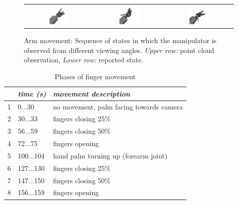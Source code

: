 \begin{figure}
\begin{tabular}{c:c:c}
\includegraphics[width=0.3\textwidth]{images/eval_vicon/sequence/arm_movement/rep_55.png} & \includegraphics[width=0.3\textwidth]{images/eval_vicon/sequence/arm_movement/rep_91.png} & \includegraphics[width=0.3\textwidth]{images/eval_vicon/sequence/arm_movement/rep_132.png} \\
\end{tabular}
\caption[Arm movement sequence]{Arm movement: Sequence of states in which the manipulator is observed from different viewing angles. \textit{Upper row:} point cloud observation, \textit{Lower row:} reported state.}
\label{fig:arm_movement_states}
\end{figure}


\begin{table}
\centering
\begin{tabular}{|c|l|l|}
\hline
 & \emph{time (s)} & \emph{movement description} \\
\hline
1 & 0$\dots$30 & no movement, palm facing towards camera \\
\hline
2 & 30$\dots$33 & fingers closing 25\% \\
\hline
3 & 56$\dots$59 & fingers closing 50\% \\
\hline
4 & 72$\dots$75 & fingers opening \\
\hline
5 & 100$\dots$104 & hand palm turning up (forearm joint) \\
\hline
6 & 127$\dots$130 & fingers closing 25\% \\
\hline
7 & 147$\dots$150 & fingers closing 50\% \\
\hline
8 & 156$\dots$159 & fingers opening \\
\hline
\end{tabular}
\caption{Phases of finger movement}
\label{tab:vic_finger_movement_phases}
\end{table}

